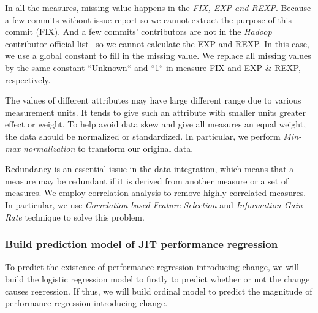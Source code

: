 In all the measures, missing value happens in the \emph{FIX, EXP and REXP}. Because a few commits without issue report so we cannot extract the purpose of this commit (FIX). And a few commits' contributors are not in the \emph{Hadoop} contributor official list~\cite{hadoop_2017} so we cannot calculate the EXP and REXP. In this case, we use a global constant to fill in the missing value. We replace all missing values by the same constant ``Unknown`` and ``1`` in measure FIX and EXP \& REXP, respectively.

The values of different attributes may have large different range due to various measurement units. It tends to give such an attribute with smaller units greater effect or weight. To help avoid data skew and give all measures an equal weight, the data should be normalized or standardized. In particular, we perform \emph{Min-max normalization} to transform our original data.

Redundancy is an essential issue in the data integration, which means that a measure may be redundant if it is derived from another measure or a set of measures. We employ correlation analysis to remove highly correlated measures. In particular, we use \emph{Correlation-based Feature Selection} and \emph{Information Gain Rate} technique to solve this problem.

\subsubsection{Build prediction model of JIT performance regression}
To predict the existence of performance regression introducing change, we will build the logistic regression model to firstly to predict whether or not the change causes regression. If thus, we will build ordinal model to predict the magnitude of performance regression introducing change.

